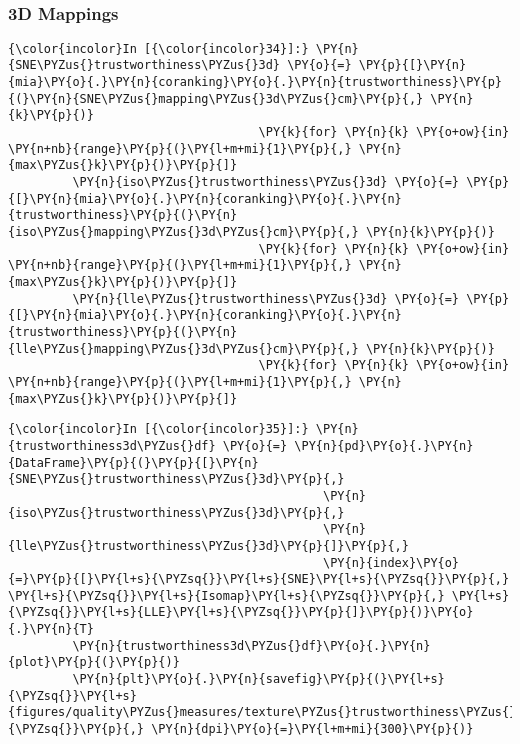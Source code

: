     \begin{center}
    \end{center}
    { \hspace*{\fill} \\}

    \subsubsection{3D Mappings}\label{d-mappings}

    \begin{Verbatim}[commandchars=\\\{\}]
{\color{incolor}In [{\color{incolor}34}]:} \PY{n}{SNE\PYZus{}trustworthiness\PYZus{}3d} \PY{o}{=} \PY{p}{[}\PY{n}{mia}\PY{o}{.}\PY{n}{coranking}\PY{o}{.}\PY{n}{trustworthiness}\PY{p}{(}\PY{n}{SNE\PYZus{}mapping\PYZus{}3d\PYZus{}cm}\PY{p}{,} \PY{n}{k}\PY{p}{)}
                                   \PY{k}{for} \PY{n}{k} \PY{o+ow}{in} \PY{n+nb}{range}\PY{p}{(}\PY{l+m+mi}{1}\PY{p}{,} \PY{n}{max\PYZus{}k}\PY{p}{)}\PY{p}{]}
         \PY{n}{iso\PYZus{}trustworthiness\PYZus{}3d} \PY{o}{=} \PY{p}{[}\PY{n}{mia}\PY{o}{.}\PY{n}{coranking}\PY{o}{.}\PY{n}{trustworthiness}\PY{p}{(}\PY{n}{iso\PYZus{}mapping\PYZus{}3d\PYZus{}cm}\PY{p}{,} \PY{n}{k}\PY{p}{)}
                                   \PY{k}{for} \PY{n}{k} \PY{o+ow}{in} \PY{n+nb}{range}\PY{p}{(}\PY{l+m+mi}{1}\PY{p}{,} \PY{n}{max\PYZus{}k}\PY{p}{)}\PY{p}{]}
         \PY{n}{lle\PYZus{}trustworthiness\PYZus{}3d} \PY{o}{=} \PY{p}{[}\PY{n}{mia}\PY{o}{.}\PY{n}{coranking}\PY{o}{.}\PY{n}{trustworthiness}\PY{p}{(}\PY{n}{lle\PYZus{}mapping\PYZus{}3d\PYZus{}cm}\PY{p}{,} \PY{n}{k}\PY{p}{)}
                                   \PY{k}{for} \PY{n}{k} \PY{o+ow}{in} \PY{n+nb}{range}\PY{p}{(}\PY{l+m+mi}{1}\PY{p}{,} \PY{n}{max\PYZus{}k}\PY{p}{)}\PY{p}{]}
\end{Verbatim}

    \begin{Verbatim}[commandchars=\\\{\}]
{\color{incolor}In [{\color{incolor}35}]:} \PY{n}{trustworthiness3d\PYZus{}df} \PY{o}{=} \PY{n}{pd}\PY{o}{.}\PY{n}{DataFrame}\PY{p}{(}\PY{p}{[}\PY{n}{SNE\PYZus{}trustworthiness\PYZus{}3d}\PY{p}{,}
                                            \PY{n}{iso\PYZus{}trustworthiness\PYZus{}3d}\PY{p}{,}
                                            \PY{n}{lle\PYZus{}trustworthiness\PYZus{}3d}\PY{p}{]}\PY{p}{,}
                                            \PY{n}{index}\PY{o}{=}\PY{p}{[}\PY{l+s}{\PYZsq{}}\PY{l+s}{SNE}\PY{l+s}{\PYZsq{}}\PY{p}{,} \PY{l+s}{\PYZsq{}}\PY{l+s}{Isomap}\PY{l+s}{\PYZsq{}}\PY{p}{,} \PY{l+s}{\PYZsq{}}\PY{l+s}{LLE}\PY{l+s}{\PYZsq{}}\PY{p}{]}\PY{p}{)}\PY{o}{.}\PY{n}{T}
         \PY{n}{trustworthiness3d\PYZus{}df}\PY{o}{.}\PY{n}{plot}\PY{p}{(}\PY{p}{)}
         \PY{n}{plt}\PY{o}{.}\PY{n}{savefig}\PY{p}{(}\PY{l+s}{\PYZsq{}}\PY{l+s}{figures/quality\PYZus{}measures/texture\PYZus{}trustworthiness\PYZus{}3d.png}\PY{l+s}{\PYZsq{}}\PY{p}{,} \PY{n}{dpi}\PY{o}{=}\PY{l+m+mi}{300}\PY{p}{)}
\end{Verbatim}

